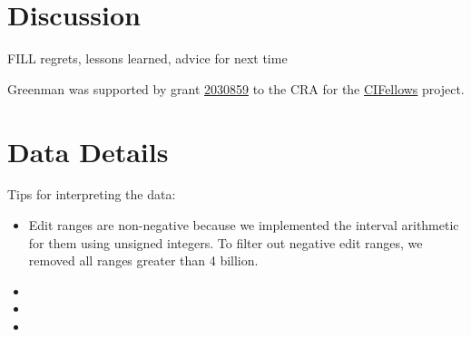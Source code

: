 \documentclass[english,submission,cleveref]{programming}
\begin{document}
\section{Discussion}
\label{s:conclusion}
\label{s:discussion}

FILL regrets, lessons learned, advice for next time



\acks

Greenman was supported by
grant \href{https://nsf.gov/awardsearch/showAward?AWD_ID=2030859&HistoricalAwards=false}{2030859}
to the CRA for the \href{https://cifellows2020.org}{CIFellows} project.

\newpage

\appendix

\section{Data Details}

Tips for interpreting the data:

\begin{itemize}
  \item
    Edit ranges are non-negative because we
    implemented the interval arithmetic for them using unsigned integers.
    To filter out negative edit ranges, we removed all ranges
    greater than 4 billion.

  \item
  \item
  \item
\end{itemize}

\newpage

{ \printbibliography }
\end{document}
